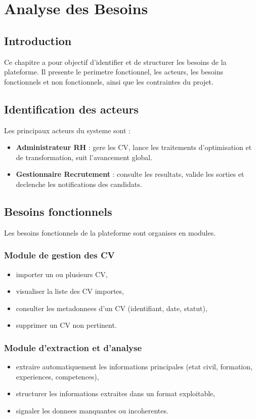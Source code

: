 \chapter{Analyse des Besoins}
\label{chap:analyse-besoins}

\section{Introduction}
Ce chapitre a pour objectif d'identifier et de structurer les besoins de la plateforme. Il presente le perimetre fonctionnel, les acteurs, les besoins fonctionnels et non fonctionnels, ainsi que les contraintes du projet.

\section{Identification des acteurs}
Les principaux acteurs du systeme sont :
\begin{itemize}[label=--]
    \item \textbf{Administrateur RH} : gere les CV, lance les traitements d'optimisation et de transformation, suit l'avancement global.
    \item \textbf{Gestionnaire Recrutement} : consulte les resultats, valide les sorties et declenche les notifications des candidats.
\end{itemize}

\section{Besoins fonctionnels}
Les besoins fonctionnels de la plateforme sont organises en modules.

\subsection{Module de gestion des CV}
\begin{itemize}[label=--]
    \item importer un ou plusieurs CV,
    \item visualiser la liste des CV importes,
    \item consulter les metadonnees d'un CV (identifiant, date, statut),
    \item supprimer un CV non pertinent.
\end{itemize}

\subsection{Module d'extraction et d'analyse}
\begin{itemize}[label=--]
    \item extraire automatiquement les informations principales (etat civil, formation, experiences, competences),
    \item structurer les informations extraites dans un format exploitable,
    \item signaler les donnees manquantes ou incoherentes.
\end{itemize}

